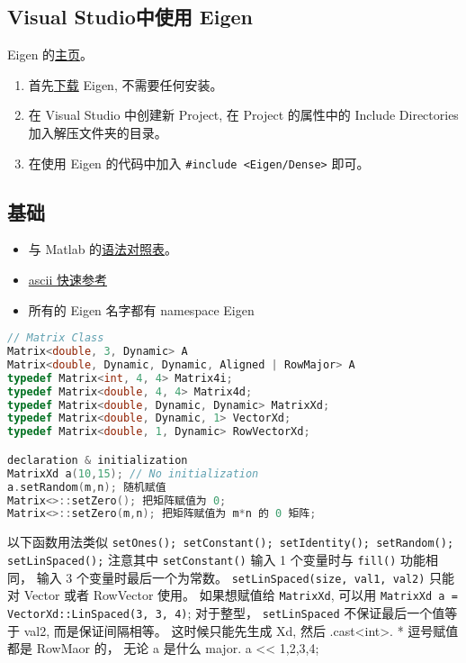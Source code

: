 
\subsection{Visual Studio中使用 Eigen}
Eigen 的\href{http://eigen.tuxfamily.org/index.php?title=Main_Page}{主页}。
\begin{enumerate}
\item 首先\href{http://eigen.tuxfamily.org/index.php?title=Main_Page#Documentation}{下载} Eigen, 不需要任何安装。
\item 在 Visual Studio 中创建新 Project, 在 Project 的属性中的 Include Directories 加入解压文件夹的目录。
\item 在使用 Eigen 的代码中加入 \verb|#include <Eigen/Dense>| 即可。
\end{enumerate}

\subsection{基础}
\begin{itemize}
\item 与 Matlab 的\href{https://eigen.tuxfamily.org/dox/AsciiQuickReference.txt}{语法对照表}。
\item \href{https://eigen.tuxfamily.org/dox/AsciiQuickReference.txt}{ascii 快速参考}
\item 所有的 Eigen 名字都有 namespace Eigen
\end{itemize}

\begin{lstlisting}[language=cpp]
// Matrix Class
Matrix<double, 3, Dynamic> A
Matrix<double, Dynamic, Dynamic, Aligned | RowMajor> A
typedef Matrix<int, 4, 4> Matrix4i;
typedef Matrix<double, 4, 4> Matrix4d;
typedef Matrix<double, Dynamic, Dynamic> MatrixXd;
typedef Matrix<double, Dynamic, 1> VectorXd;
typedef Matrix<double, 1, Dynamic> RowVectorXd;

declaration & initialization
MatrixXd a(10,15); // No initialization
a.setRandom(m,n); 随机赋值
Matrix<>::setZero(); 把矩阵赋值为 0;
Matrix<>::setZero(m,n); 把矩阵赋值为 m*n 的 0 矩阵;
\end{lstlisting}

以下函数用法类似
\verb|setOnes(); setConstant(); setIdentity(); setRandom(); setLinSpaced();|
注意其中 \verb|setConstant()| 输入 1 个变量时与 \verb|fill()| 功能相同， 输入 3 个变量时最后一个为常数。 \verb|setLinSpaced(size, val1, val2)| 只能对 Vector 或者 RowVector 使用。 如果想赋值给 \verb|MatrixXd|, 可以用 \verb|MatrixXd a = VectorXd::LinSpaced(3, 3, 4)|; 对于整型， \verb|setLinSpaced| 不保证最后一个值等于 val2, 而是保证间隔相等。 这时候只能先生成 Xd, 然后 .cast<int>.
* 逗号赋值都是 RowMaor 的， 无论 a 是什么 major.
a << 1,2,3,4;

